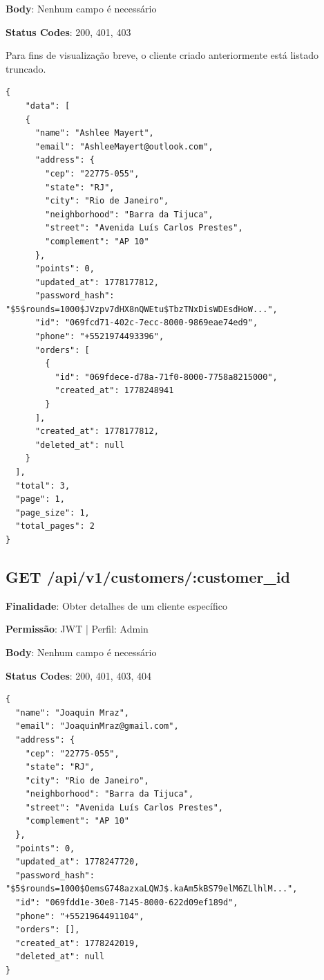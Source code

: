 \noindent\textbf{Body}: Nenhum campo é necessário

\noindent\textbf{Status Codes}: 200, 401, 403

\begin{tcolorbox}[colback=green!5, colframe=black, title=\textbf{200 OK}]
Para fins de visualização breve, o cliente criado anteriormente está listado truncado.
\begin{verbatim}
{
    "data": [
    {
      "name": "Ashlee Mayert",
      "email": "AshleeMayert@outlook.com",
      "address": {
        "cep": "22775-055",
        "state": "RJ",
        "city": "Rio de Janeiro",
        "neighborhood": "Barra da Tijuca",
        "street": "Avenida Luís Carlos Prestes",
        "complement": "AP 10"
      },
      "points": 0,
      "updated_at": 1778177812,
      "password_hash": "$5$rounds=1000$JVzpv7dHX8nQWEtu$TbzTNxDisWDEsdHoW...",
      "id": "069fcd71-402c-7ecc-8000-9869eae74ed9",
      "phone": "+5521974493396",
      "orders": [
        {
          "id": "069fdece-d78a-71f0-8000-7758a8215000",
          "created_at": 1778248941
        }
      ],
      "created_at": 1778177812,
      "deleted_at": null
    }
  ],
  "total": 3,
  "page": 1,
  "page_size": 1,
  "total_pages": 2
}
\end{verbatim}
\end{tcolorbox}

\subsection{GET /api/v1/customers/:customer\_id}

\noindent\textbf{Finalidade}: Obter detalhes de um cliente específico

\noindent\textbf{Permissão}: JWT | Perfil: Admin

\noindent\textbf{Body}: Nenhum campo é necessário

\noindent\textbf{Status Codes}: 200, 401, 403, 404

\begin{tcolorbox}[colback=green!5, colframe=black, title=\textbf{200 OK}]
\begin{verbatim}
{
  "name": "Joaquin Mraz",
  "email": "JoaquinMraz@gmail.com",
  "address": {
    "cep": "22775-055",
    "state": "RJ",
    "city": "Rio de Janeiro",
    "neighborhood": "Barra da Tijuca",
    "street": "Avenida Luís Carlos Prestes",
    "complement": "AP 10"
  },
  "points": 0,
  "updated_at": 1778247720,
  "password_hash": "$5$rounds=1000$OemsG748azxaLQWJ$.kaAm5kBS79elM6ZLlhlM...",
  "id": "069fdd1e-30e8-7145-8000-622d09ef189d",
  "phone": "+5521964491104",
  "orders": [],
  "created_at": 1778242019,
  "deleted_at": null
}
\end{verbatim}
\end{tcolorbox}

